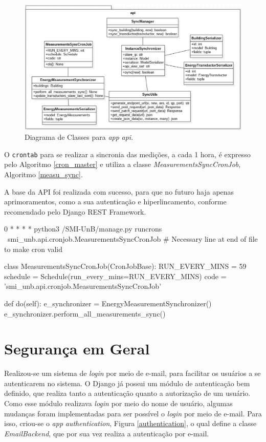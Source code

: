 \begin{figure}[!h]
    \centering
    \includegraphics[keepaspectratio=true,scale=0.55]{figuras/api.eps}
    \caption{Diagrama de Classes para \textit{app} \textit{api}.}
    \label{api}
\end{figure}

O \verb|crontab| para se realizar a sincronia das medições, a cada 1 hora, é expresso pelo Algoritmo \ref{cron_master} e utiliza a classe \textit{MeasurementsSyncCronJob}, Algoritmo \ref{measu_sync}.

A base da API foi realizada com sucesso, para que no futuro haja apenas aprimoramentos, como a sua autenticação e hiperlincamento, conforme recomendado pelo Django REST Framework.

\begin{python}[caption={\textit{Cron} para execução da sincronia dos dados de energia.}, captionpos=b, label={cron_master}]
0 * * * * python3 /SMI-UnB/manage.py runcrons \
smi_unb.api.cronjob.MeasurementsSyncCronJob
# Necessary line at end of file to make cron valid
\end{python}

\begin{python}[caption={Classe MeasurementsSyncCronJob.}, captionpos=b, label={measu_sync}]
class MeasurementsSyncCronJob(CronJobBase):
    RUN_EVERY_MINS = 59
    schedule = Schedule(run_every_mins=RUN_EVERY_MINS)
    code = 'smi_unb.api.cronjob.MeasurementsSyncCronJob'

    def do(self):
        e_synchronizer = EnergyMeasurementSynchronizer()
        e_synchronizer.perform_all_measurements_sync()
\end{python}

\section{Segurança em Geral}
Realizou-se um sistema de \textit{login} por meio de e-mail, para facilitar os usuários a se autenticarem no sistema. O Django já possui um módulo de autenticação bem definido, que realiza tanto a autenticação quanto a autorização de um usuário. Como esse módulo realizava \textit{login} por meio do nome de usuário, algumas mudanças foram implementadas para ser possível o \textit{login} por meio de e-mail. Para isso, criou-se o \textit{app} \textit{authentication}, Figura \ref{authentication}, o qual define a classe \textit{EmailBackend}, que por sua vez realiza a autenticação por e-mail.

